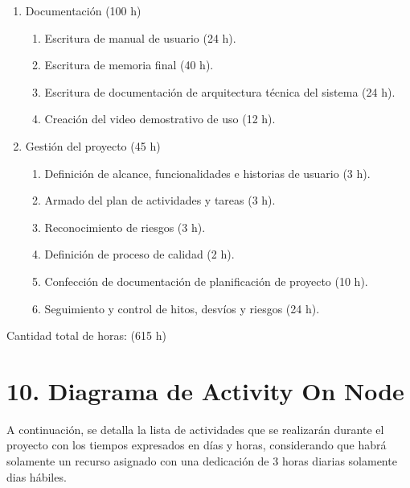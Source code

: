 \documentclass[
11pt, %
]{charter}
\begin{document}
\begin{enumerate}
\item Documentación (100 h)
	\begin{enumerate}				
	\item Escritura de manual de usuario (24 h).			
	\item Escritura de memoria final (40 h).
	\item Escritura de documentación de arquitectura técnica del sistema (24 h).		
	\item Creación del video demostrativo de uso (12 h).				
	\end{enumerate}	


\vspace{2em}

\item Gestión del proyecto (45 h)
	\begin{enumerate}
	\item Definición de alcance, funcionalidades e historias de usuario (3 h).	
	\item Armado del plan de actividades y tareas (3 h).
	\item Reconocimiento de riesgos (3 h).
	\item Definición de proceso de calidad (2 h).
	\item Confección de documentación de planificación de proyecto (10 h).
	\item Seguimiento y control de hitos, desvíos y riesgos (24 h).	
	\end{enumerate}
		
\end{enumerate}

Cantidad total de horas: (615 h)


\section{10. Diagrama de Activity On Node}
\label{sec:AoN}

A continuación, se detalla la lista de actividades que se realizarán durante el proyecto con los tiempos expresados en días y horas, considerando que habrá solamente un recurso asignado con una dedicación de 3 horas diarias solamente dias hábiles.
\end{document}
